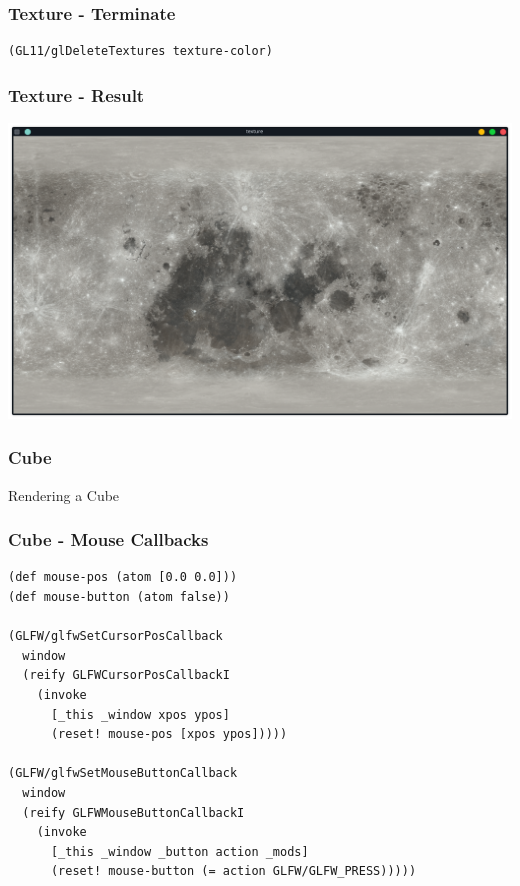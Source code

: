 \documentclass[aspectratio=169,11pt,xcolor=dvipsnames]{beamer}
\begin{document}
\begin{frame}[fragile]
  \frametitle{Texture {-} Terminate}
  \begin{verbatim}
(GL11/glDeleteTextures texture-color)
  \end{verbatim}
\end{frame}

\begin{frame}
  \frametitle{Texture {-} Result}
  \begin{center}
    \includegraphics[width=.8\textwidth]{texture}
  \end{center}
\end{frame}

\begin{frame}
  \frametitle{Cube}
  \begin{center}
    \begin{huge}
      Rendering a Cube
    \end{huge}
  \end{center}
\end{frame}

\begin{frame}[fragile]
  \frametitle{Cube {-} Mouse Callbacks}
  \begin{verbatim}
(def mouse-pos (atom [0.0 0.0]))
(def mouse-button (atom false))

(GLFW/glfwSetCursorPosCallback
  window
  (reify GLFWCursorPosCallbackI
    (invoke
      [_this _window xpos ypos]
      (reset! mouse-pos [xpos ypos]))))

(GLFW/glfwSetMouseButtonCallback
  window
  (reify GLFWMouseButtonCallbackI
    (invoke
      [_this _window _button action _mods]
      (reset! mouse-button (= action GLFW/GLFW_PRESS)))))
  \end{verbatim}
\end{frame}
\end{document}
